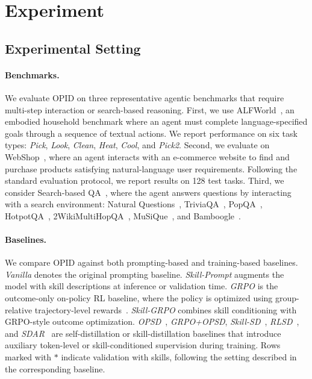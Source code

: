 

\section{Experiment}
\subsection{Experimental Setting}

\paragraph{Benchmarks.}
We evaluate OPID on three representative agentic benchmarks that require multi-step interaction or search-based reasoning. First, we use ALFWorld~\citep{shridhar2020alfworld}, an embodied household benchmark where an agent must complete language-specified goals through a sequence of textual actions. We report performance on six task types: \textit{Pick}, \textit{Look}, \textit{Clean}, \textit{Heat}, \textit{Cool}, and \textit{Pick2}. Second, we evaluate on WebShop~\citep{yao2022webshop}, where an agent interacts with an e-commerce website to find and purchase products satisfying natural-language user requirements. Following the standard evaluation protocol, we report results on 128 test tasks. Third, we consider Search-based QA~\citep{jin2025searchr1}, where the agent answers questions by interacting with a search environment: Natural Questions~\citep{kwiatkowski2019natural}, TriviaQA~\citep{joshi2017triviaqa}, PopQA~\citep{mallen2023popqa}, HotpotQA~\citep{yang2018hotpotqa}, 2WikiMultiHopQA~\citep{ho2020constructing}, MuSiQue~\citep{trivedi2022musique}, and Bamboogle~\citep{press2023measuring}.

\paragraph{Baselines.}
We compare OPID against both prompting-based and training-based baselines. \textit{Vanilla} denotes the original prompting baseline. \textit{Skill-Prompt} augments the model with skill descriptions at inference or validation time. \textit{GRPO} is the outcome-only on-policy RL baseline, where the policy is optimized using group-relative trajectory-level rewards~\citep{shao2024deepseekmath}. \textit{Skill-GRPO} combines skill conditioning with GRPO-style outcome optimization. \textit{OPSD}~\citep{zhao2026opsd}, \textit{GRPO+OPSD}, \textit{Skill-SD}~\citep{wang2026skillsd}, \textit{RLSD}~\citep{yang2026rlsd}, and \textit{SDAR}~\citep{lu2026sdar} are self-distillation or skill-distillation baselines that introduce auxiliary token-level or skill-conditioned supervision during training. Rows marked with $*$ indicate validation with skills, following the setting described in the corresponding baseline.

